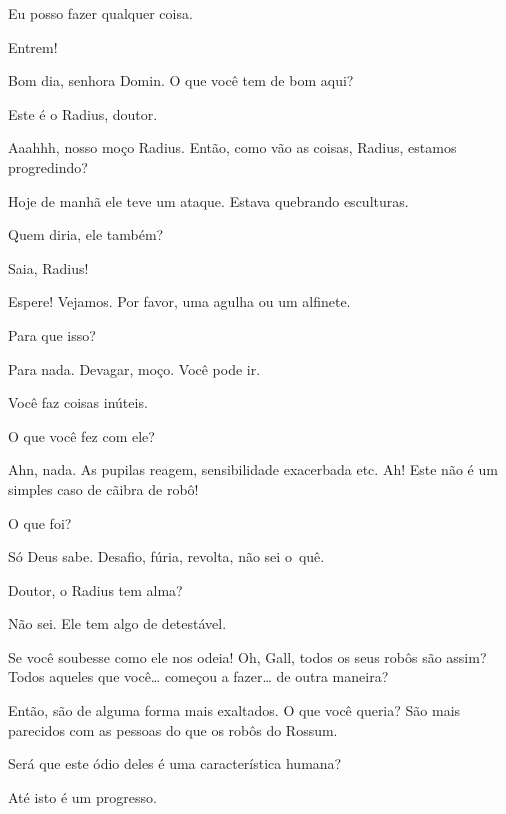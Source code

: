  Eu posso fazer qualquer coisa.

 Entrem!

  Bom dia, senhora Domin. O que você tem de bom aqui?

 Este é o Radius, doutor.

 Aaahhh, nosso moço Radius. Então, como vão as coisas, Radius, estamos
progredindo?

 Hoje de manhã ele teve um ataque. Estava quebrando esculturas.

 Quem diria, ele também?

 Saia, Radius!

 Espere!  Vejamos. Por
favor, uma agulha ou um alfinete.

  Para que isso?

 Para nada. 
Devagar, moço. Você pode ir.

 Você faz coisas inúteis. 

 O que você fez com ele?

  Ahn, nada. As pupilas reagem, sensibilidade
exacerbada etc. Ah! Este não é um simples caso de cãibra de robô!

 O que foi?

 Só Deus sabe. Desafio, fúria, revolta, não sei \mbox{o quê}.

 Doutor, o Radius tem alma?

 Não sei. Ele tem algo de detestável.

 Se você soubesse como ele nos odeia! Oh, Gall, todos os seus robôs são
assim? Todos aqueles que você\ldots{} começou a fazer\ldots{} de outra maneira?

 Então, são de alguma forma mais exaltados. O que você queria? São
mais parecidos com as pessoas do que os robôs do Rossum.

 Será que este ódio deles é uma característica humana?

  Até isto é um progresso.

